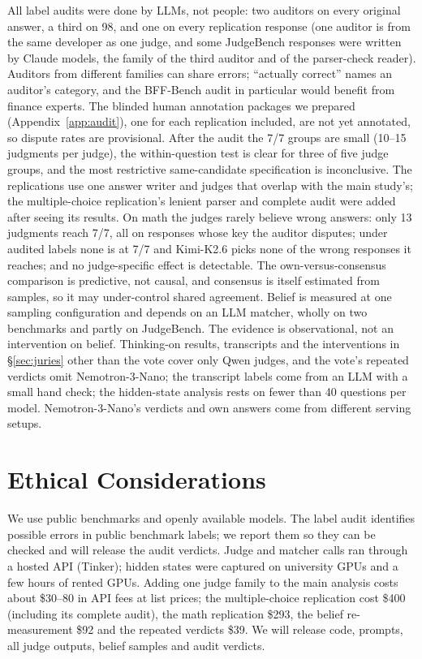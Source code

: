 \documentclass[11pt]{article}
\begin{document}
All label audits were done by LLMs, not people: two auditors on every original answer, a third on 98, and one on
every replication response (one auditor is from the same developer as one judge, and some JudgeBench responses were written by Claude models,
the family of the third auditor and of the parser-check reader). Auditors from different families
can share errors; ``actually correct'' names an auditor's category, and the BFF-Bench audit in particular would
benefit from finance experts. The blinded human annotation packages we prepared (Appendix~\ref{app:audit}), one for
each replication included, are not yet annotated, so dispute rates are provisional. After the audit the 7/7 groups are small (10--15 judgments per judge), the within-question test is
clear for three of five judge groups, and the most restrictive same-candidate specification is inconclusive. The
replications use one answer writer and judges that overlap with the main study's; the multiple-choice replication's
lenient parser and complete audit were added after seeing its results. On math the judges rarely believe wrong
answers: only 13 judgments reach 7/7, all on responses whose key the auditor disputes; under audited labels none is
at 7/7 and Kimi-K2.6 picks none of the wrong responses it reaches; and no judge-specific effect is detectable. The own-versus-consensus comparison is
predictive, not causal, and consensus is itself estimated from samples, so it may under-control shared agreement. Belief is measured at one sampling configuration and
depends on an LLM matcher, wholly on two benchmarks and partly on JudgeBench. The evidence is observational, not an intervention on belief.
Thinking-on results, transcripts and the interventions in \S\ref{sec:juries} other than the vote cover only Qwen
judges, and the vote's repeated verdicts omit Nemotron-3-Nano; the transcript labels
come from an LLM with a small hand check; the hidden-state analysis rests on fewer than 40 questions per model.
Nemotron-3-Nano's verdicts and own answers come from different serving setups.

\section*{Ethical Considerations}

We use public benchmarks and openly available models. The label audit identifies possible errors in public
benchmark labels; we report them so they can be checked and will release the audit verdicts. Judge and matcher calls
ran through a hosted API (Tinker); hidden states were captured on university GPUs and a few hours of rented GPUs.
Adding one judge family to the main analysis costs about \$30--80 in API fees at list prices; the multiple-choice
replication cost \$400 (including its complete audit), the math replication \$293, the belief re-measurement \$92 and the repeated verdicts \$39. We will release code, prompts, all judge outputs, belief
samples and audit verdicts.
\end{document}
